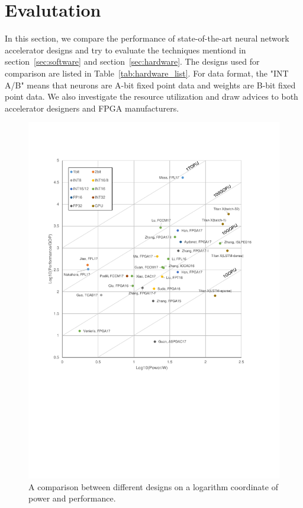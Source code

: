 \section{Evalutation}\label{sec:evaluation}

In this section, we compare the performance of state-of-the-art neural network accelerator designs and try to evaluate the techniques mentiond in section~\ref{sec:software} and section~\ref{sec:hardware}. The designs used for comparison are listed in Table~\ref{tab:hardware_list}. For data format, the "INT A/B" means that neurons are A-bit fixed point data and weights are B-bit fixed point data. We also investigate the resource utilization and draw advices to both accelerator designers and FPGA manufacturers.



\begin{figure}[ht]
    \centering
    \includegraphics[width=1.0\columnwidth]{fig/efficiency.pdf}
    \caption{A comparison between different designs on a logarithm coordinate of power and performance. }
    \label{fig:efficiency}
\end{figure}

